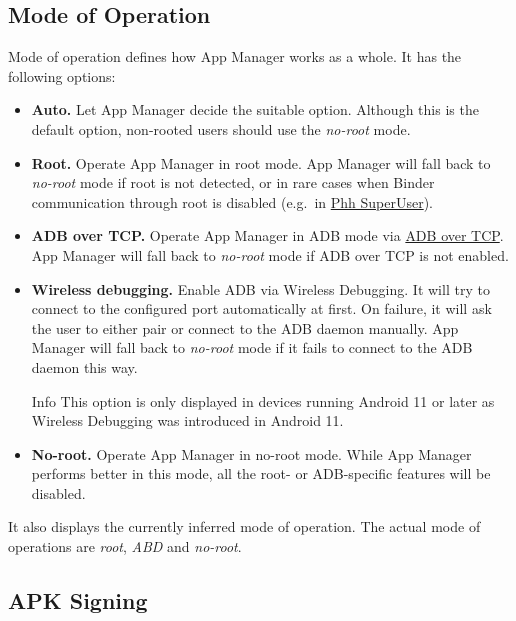 \subsection{Mode of Operation}\label{subsec:mode-of-operation} %
Mode of operation defines how App Manager works as a whole. It has the following options:
\begin{itemize}
    \item \textbf{Auto.} Let App Manager decide the suitable option.
    Although this is the default option, non-rooted users should use the \textit{no-root} mode.

    \item \textbf{Root.} Operate App Manager in root mode. App Manager will fall back to \textit{no-root} mode if root
    is not detected, or in rare cases when Binder communication through root is disabled (e.g.\ in \href{https://github.com/MuntashirAkon/AppManager/issues/606}{Phh SuperUser}).

    \item \textbf{ADB over TCP.} Operate App Manager in ADB mode via \hyperref[sec:adb-over-tcp]{ADB over TCP}.
    App Manager will fall back to \textit{no-root} mode if ADB over TCP is not enabled.

    \item \textbf{Wireless debugging.} Enable ADB via Wireless Debugging. It will try to connect to the configured port
    automatically at first. On failure, it will ask the user to either pair or connect to the ADB daemon manually.
    App Manager will fall back to \textit{no-root} mode if it fails to connect to the ADB daemon this way.
    \begin{tip}{Info}
        This option is only displayed in devices running Android 11 or later as Wireless Debugging was introduced in Android 11.
    \end{tip}

    \item \textbf{No-root.} Operate App Manager in no-root mode. While App Manager performs better in this mode,
    all the root- or ADB-specific features will be disabled.
\end{itemize}

It also displays the currently inferred mode of operation. The actual mode of operations are \textit{root}, \textit{ABD} and \textit{no-root}.


\subsection{APK Signing}\label{subsec:apk-signing} %


